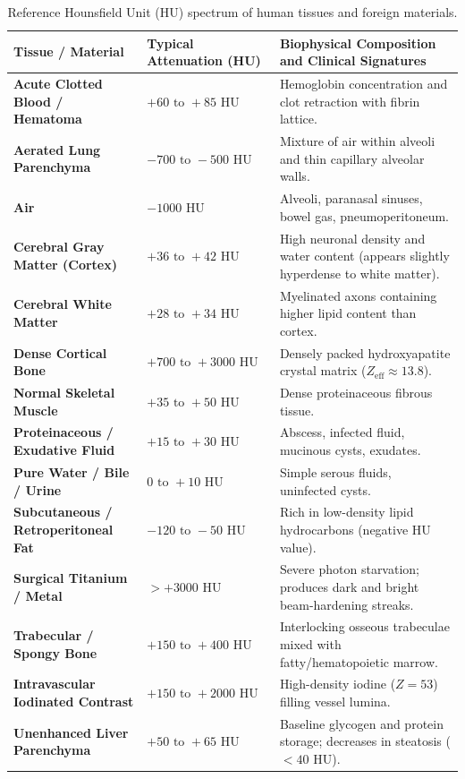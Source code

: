 \documentclass[11pt,a4paper]{article}
\begin{document}
\begin{table}[htbp]
\centering
\small
\renewcommand{\arraystretch}{1.2}
\begin{tabular}{p{5cm}p{3cm}p{7cm}}
\toprule
\textbf{Tissue / Material} & \textbf{Typical Attenuation (HU)} & \textbf{Biophysical Composition and Clinical Signatures} \\
\midrule
\textbf{Acute Clotted Blood / Hematoma} & $+60\text{ to } +85\text{ HU}$ & Hemoglobin concentration and clot retraction with fibrin lattice. \\
\textbf{Aerated Lung Parenchyma} & $-700\text{ to } -500\text{ HU}$ & Mixture of air within alveoli and thin capillary alveolar walls. \\
\textbf{Air} & $-1000\text{ HU}$ & Alveoli, paranasal sinuses, bowel gas, pneumoperitoneum. \\
\textbf{Cerebral Gray Matter (Cortex)} & $+36\text{ to } +42\text{ HU}$ & High neuronal density and water content (appears slightly hyperdense to white matter). \\
\textbf{Cerebral White Matter} & $+28\text{ to } +34\text{ HU}$ & Myelinated axons containing higher lipid content than cortex. \\
\textbf{Dense Cortical Bone} & $+700\text{ to } +3000\text{ HU}$ & Densely packed hydroxyapatite crystal matrix ($Z_{\text{eff}} \approx 13.8$). \\
\textbf{Normal Skeletal Muscle} & $+35\text{ to } +50\text{ HU}$ & Dense proteinaceous fibrous tissue. \\
\textbf{Proteinaceous / Exudative Fluid} & $+15\text{ to } +30\text{ HU}$ & Abscess, infected fluid, mucinous cysts, exudates. \\
\textbf{Pure Water / Bile / Urine} & $0\text{ to } +10\text{ HU}$ & Simple serous fluids, uninfected cysts. \\
\textbf{Subcutaneous / Retroperitoneal Fat} & $-120\text{ to } -50\text{ HU}$ & Rich in low-density lipid hydrocarbons (negative HU value). \\
\textbf{Surgical Titanium / Metal} & $>+3000\text{ HU}$ & Severe photon starvation; produces dark and bright beam-hardening streaks. \\
\textbf{Trabecular / Spongy Bone} & $+150\text{ to } +400\text{ HU}$ & Interlocking osseous trabeculae mixed with fatty/hematopoietic marrow. \\
\textbf{Intravascular Iodinated Contrast} & $+150\text{ to } +2000\text{ HU}$ & High-density iodine ($Z=53$) filling vessel lumina. \\
\textbf{Unenhanced Liver Parenchyma} & $+50\text{ to } +65\text{ HU}$ & Baseline glycogen and protein storage; decreases in steatosis ($<40\text{ HU}$). \\
\bottomrule
\end{tabular}
\caption{Reference Hounsfield Unit (HU) spectrum of human tissues and foreign materials.}
\label{tab:hu_scale}
\end{table}
\end{document}
